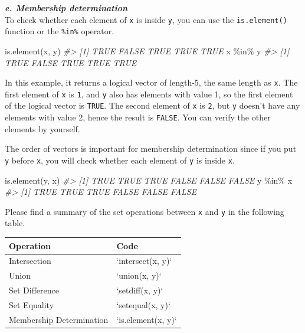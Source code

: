 \documentclass[
]{book}
\newenvironment{Shaded}{\begin{snugshade}}{\end{snugshade}}
\newcommand{\CommentTok}[1]{\textcolor[rgb]{0.56,0.35,0.01}{\textit{#1}}}
\newcommand{\FunctionTok}[1]{\textcolor[rgb]{0.00,0.00,0.00}{#1}}
\newcommand{\NormalTok}[1]{#1}
\newcommand{\SpecialCharTok}[1]{\textcolor[rgb]{0.00,0.00,0.00}{#1}}
\begin{document}
\textbf{\emph{e. Membership determination}}\\
To check whether each element of \texttt{x} is inside \texttt{y}, you can use the \texttt{is.element()} function or the \texttt{\%in\%} operator.

\begin{Shaded}
\begin{Highlighting}[]
\FunctionTok{is.element}\NormalTok{(x, y)}
\CommentTok{\#\textgreater{} [1]  TRUE FALSE  TRUE  TRUE  TRUE}
\NormalTok{x }\SpecialCharTok{\%in\%}\NormalTok{ y}
\CommentTok{\#\textgreater{} [1]  TRUE FALSE  TRUE  TRUE  TRUE}
\end{Highlighting}
\end{Shaded}

In this example, it returns a logical vector of length-5, the same length as \texttt{x}. The first element of \texttt{x} is \texttt{1}, and \texttt{y} also has elements with value 1, so the first element of the logical vector is \texttt{TRUE}. The second element of \texttt{x} is \texttt{2}, but \texttt{y} doesn't have any elements with value 2, hence the result is \texttt{FALSE}. You can verify the other elements by yourself.

The order of vectors is important for membership determination since if you put \texttt{y} before \texttt{x}, you will check whether each element of \texttt{y} is inside \texttt{x}.

\begin{Shaded}
\begin{Highlighting}[]
\FunctionTok{is.element}\NormalTok{(y, x)}
\CommentTok{\#\textgreater{} [1]  TRUE  TRUE  TRUE FALSE FALSE FALSE}
\NormalTok{y }\SpecialCharTok{\%in\%}\NormalTok{ x}
\CommentTok{\#\textgreater{} [1]  TRUE  TRUE  TRUE FALSE FALSE FALSE}
\end{Highlighting}
\end{Shaded}

Please find a summary of the set operations between \texttt{x} and \texttt{y} in the following table.

\begin{tabular}{l|l}
\hline
Operation & Code\\
\hline
Intersection & `intersect(x, y)`\\
\hline
Union & `union(x, y)`\\
\hline
Set Difference & `setdiff(x, y)`\\
\hline
Set Equality & `setequal(x, y)`\\
\hline
Membership Determination & `is.element(x, y)`\\
\hline
\end{tabular}
\end{document}
